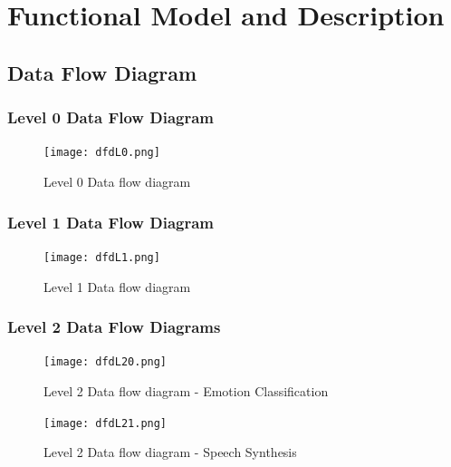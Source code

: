 \documentclass[oneside,a4paper,12pt]{book}
\begin{document}
 
\section{Functional Model and Description}  

\subsection{Data Flow Diagram}
	\subsubsection{Level 0 Data Flow Diagram}
\begin{center}
	\begin{figure}[!htbp]
		\centering
		\texttt{[image: dfdL0.png]}
		\caption{Level 0 Data flow diagram}
		\label{fig:act-dig}
	\end{figure}
\end{center}

	\subsubsection{Level 1 Data Flow Diagram}
\begin{center}
	\begin{figure}[!htbp]
		\centering
		\texttt{[image: dfdL1.png]}
		\caption{Level 1 Data flow diagram}
		\label{fig:act-dig}
	\end{figure}
\end{center}

\subsubsection{Level 2 Data Flow Diagrams}
\begin{center}
	\begin{figure}[!htbp]
		\centering
		\texttt{[image: dfdL20.png]}
		\caption{Level 2 Data flow diagram - Emotion Classification}
		\label{fig:act-dig}
	\end{figure}
\end{center}

\begin{center}
	\begin{figure}[!htbp]
		\centering
		\texttt{[image: dfdL21.png]}
		\caption{Level 2 Data flow diagram - Speech Synthesis}
		\label{fig:act-dig}
	\end{figure}
\end{center}
 
\end{document}
